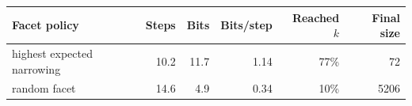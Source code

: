 \begin{tabular}{@{}lrrrrr@{}}
\toprule
Facet policy & Steps & Bits & Bits/step & Reached $k$ & Final size \\
\midrule
highest expected narrowing & 10.2 & 11.7 & 1.14 & 77\% & 72 \\
random facet & 14.6 & 4.9 & 0.34 & 10\% & 5206 \\
\bottomrule
\end{tabular}
